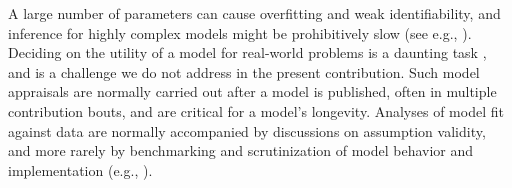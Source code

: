 \documentclass[oneside]{article}
\begin{document}
A large number of parameters can cause overfitting and weak identifiability, and inference for highly complex models might be prohibitively slow (see e.g., \citealp{lartillot11}).
Deciding on the utility of a model for real-world problems is a daunting task \citep{brown18,shepherd18}, and is a challenge we do not address in the present contribution.
Such model appraisals are normally carried out after a model is published, often in multiple  contribution bouts, and are critical for a model's longevity.
Analyses of model fit against data are normally accompanied by discussions on assumption validity, and more rarely by benchmarking and scrutinization of model behavior and implementation (e.g., \citealp{maddison07,stadler10,rabosky13,rabosky15,moore16}).
\end{document}
